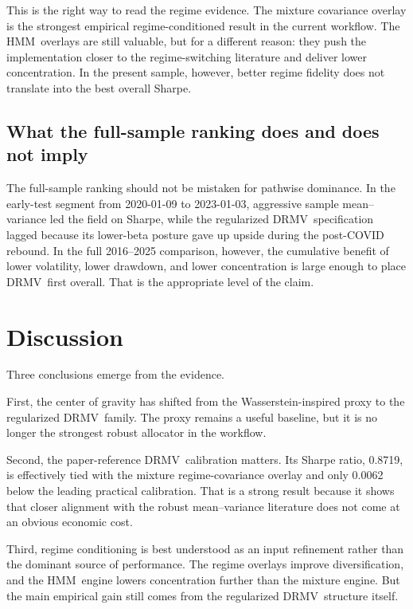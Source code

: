\documentclass[11pt]{article}
\newcommand{\DRMV}{\ensuremath{\mathrm{DRMV}}}
\newcommand{\HMM}{\ensuremath{\mathrm{HMM}}}
\begin{document}
This is the right way to read the regime evidence. The mixture covariance overlay is the strongest empirical regime-conditioned result in the current workflow. The \HMM\ overlays are still valuable, but for a different reason: they push the implementation closer to the regime-switching literature and deliver lower concentration. In the present sample, however, better regime fidelity does not translate into the best overall Sharpe.

\subsection{What the full-sample ranking does and does not imply}

The full-sample ranking should not be mistaken for pathwise dominance. In the early-test segment from 2020-01-09 to 2023-01-03, aggressive sample mean--variance led the field on Sharpe, while the regularized \DRMV\ specification lagged because its lower-beta posture gave up upside during the post-COVID rebound. In the full 2016--2025 comparison, however, the cumulative benefit of lower volatility, lower drawdown, and lower concentration is large enough to place \DRMV\ first overall. That is the appropriate level of the claim.

\section{Discussion}

Three conclusions emerge from the evidence.

First, the center of gravity has shifted from the Wasserstein-inspired proxy to the regularized \DRMV\ family. The proxy remains a useful baseline, but it is no longer the strongest robust allocator in the workflow.

Second, the paper-reference \DRMV\ calibration matters. Its Sharpe ratio, 0.8719, is effectively tied with the mixture regime-covariance overlay and only 0.0062 below the leading practical calibration. That is a strong result because it shows that closer alignment with the robust mean--variance literature does not come at an obvious economic cost.

Third, regime conditioning is best understood as an input refinement rather than the dominant source of performance. The regime overlays improve diversification, and the \HMM\ engine lowers concentration further than the mixture engine. But the main empirical gain still comes from the regularized \DRMV\ structure itself.
\end{document}
